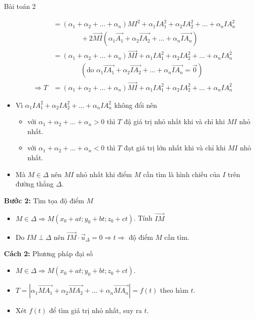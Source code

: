 \begin{dang}{Bài toán 2}
\begin{itemize}
\begin{align*}
		& =\left(\alpha_1+\alpha_2+\ldots+\alpha_n\right) MI^2+\alpha_1 I A_1^2+\alpha_2 I A_2^2+\ldots+\alpha_n I A_n^2 \\
		&\qquad\qquad+2 \vec{MI}\left(\alpha_1 \vec{A_1}+\alpha_2 \vec{IA_2}+\ldots+\alpha_n \vec{IA_n}\right) \\
		& =\left(\alpha_1+\alpha_2+\ldots+\alpha_n\right) \vec{MI}+\alpha_1 I A_1^2+\alpha_2 I A_2^2+\ldots+\alpha_n I A_n^2 \\
		&\qquad\qquad\left(\text{do } \alpha_1 \vec{IA_1}+\alpha_2 \vec{IA_2}+\ldots+\alpha_n \vec{IA_n}=\vec{0}\right) \\
\Rightarrow T & =\left(\alpha_1+\alpha_2+\ldots+\alpha_n\right) \vec{MI}+\alpha_1 I A_1^2+\alpha_2 I A_2^2+\ldots+\alpha_n I A_n^2
	\end{align*}
	
	\item Vì $\alpha_1 I A_1^2+\alpha_2 I A_2^2+\ldots+\alpha_n I A_n^2$ không đổi nên
	\begin{itemize}
		\item với $\alpha_1+\alpha_2+\ldots+\alpha_n>0$ thì $T$ đậ giá trị nhỏ nhất khi và chỉ khi $MI$ nhỏ nhất.
		\item với $\alpha_1+\alpha_2+\ldots+\alpha_n<0$ thì $T$ đạt giá trị lớn nhất khi và chỉ khi $MI$ nhỏ nhất.
	\end{itemize}
	\item Mà $M \in \Delta$ nên $MI$ nhỏ nhất khi điểm $M$ cần tìm là hình chiếu của $I$ trên đường thẳng $\Delta$.
\end{itemize}
\textbf{Bước 2:} Tìm tọa độ điểm $M$
\begin{itemize}
	\item $M \in \Delta \Rightarrow M\left(x_0+a t ; y_0+b t ; z_0+c t\right)$. Tính $\vec{I M}$
	\item Do $I M \perp \Delta$ nên $\vec{I M} \cdot \vec{u}_{\Delta}=0 \Rightarrow t \Rightarrow$ độ điểm $M$ cần tìm.
\end{itemize}
\textbf{Cách 2:} Phương pháp đại số
\begin{itemize}
	\item $M \in \Delta \Rightarrow M\left(x_0+a t ; y_0+b t ; z_0+c t\right)$.
	\item $T=\left|\alpha_1 \vec{MA_1}+\alpha_2 \vec{MA_2}+\ldots+\alpha_n \vec{MA_n}\right|=f(t)$ theo hàm $t$.
	\item Xét $f(t)$ để tìm giá trị nhỏ nhất, suy ra $t$.
\end{itemize}
\end{dang}

